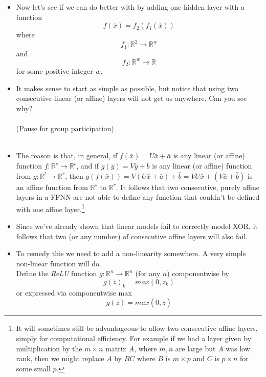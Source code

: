 \documentclass{article}
\begin{document}
\begin{itemize}
\item Now let's see if we can do better with by adding one hidden layer with a function
 $$f(\bar{x}) = f_{2}(f_{1}(\bar{x}))$$ where $$f_{1}:\mathbb{R}^{2} \rightarrow \mathbb{R}^{w}$$ and $$f_{2}:\mathbb{R}^{w} \rightarrow \mathbb{R}$$ for some positive integer $w$.

\item It makes sense to start as simple as possible, but notice that using two consecutive linear (or affine) layers will not get us anywhere.  Can you see why? \\
\\
(Pause for group participation)\\
\\

\item The reason is that, in general, if $f(\bar{x}) = U\bar{x} + \bar{a}$ is any linear (or affine) function $f: \mathbb{R}^{s} \rightarrow \mathbb{R}^{t}$, and if 
$g(\bar{y}) = V\bar{y} + \bar{b}$ is any linear (or affine) function from $g: \mathbb{R}^{t} \rightarrow \mathbb{R}^{r}$, then 
$g(f(\bar{x})) =  V( U\bar{x} + \bar{a}) + \bar{b}  = VU\bar{x} + (V\bar{a} + \bar{b})$ is an affine function from $\mathbb{R}^{s}$ to $\mathbb{R}^{r}$.
It follows that two consecutive, purely affine layers in a FFNN are not able to define any function that couldn't be defined with one affine layer.\footnote{It will sometimes still be advantageous to allow two consecutive affine layers, simply for computational efficiency.  For example if we had a layer given by multiplication by the $m\times n$ matrix $A$, where $m,n$ are large but $A$ was low rank, then we might replace $A$ by $BC$ where $B$ is $m \times p$ and $C$ is $p \times n$ for some small $p$.}

\item Since we've already shown that linear models fail to correctly model XOR, it follows that two (or any number) of consecutive affine layers will also fail.


\item To remedy this we need to add a non-linearity somewhere.  A very simple non-linear function will do.  \\
 Define the \emph{ReLU} function $g:\mathbb{R}^{n}\rightarrow \mathbb{R}^{n}$ (for any $n$) componentwise by 
 $$g(\bar{z})_{k} = max(0, z_{k})$$ or expressed via componentwise max
 $$g(\bar{z}) = max(\bar{0}, \bar{z})$$
 

\end{itemize}
\end{document}
